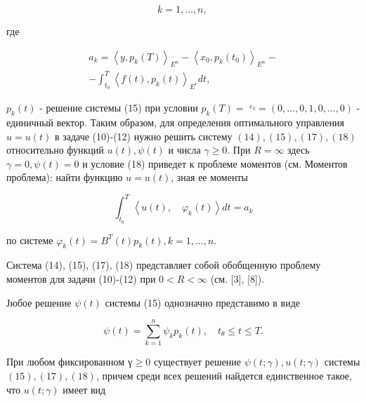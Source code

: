 \documentclass[10pt]{article}
\begin{document}
\[

k=1, \ldots, n \text {, }

\]



где



\[

\begin{gathered}

a_{k}=\left\langle y, p_{k}(T)\right\rangle_{E^{n}}-\left\langle x_{0}, p_{k}\left(t_{0}\right)\right\rangle_{E^{n}}- \\

-\int_{t_{0}}^{T}\left\langle f(t), p_{k}(t)\right\rangle_{E^{r}} d t,

\end{gathered}

\]



$p_{k}(t)$ - решение системы (15) при условии $p_{k}(T)=$ $\stackrel{e_{k}}{ }=(0, \ldots, 0,1,0, \ldots, 0)$ - единичный вектор. Таким образом, для определения оптимального управления $u=u(t)$ в задаче (10)-(12) нужно решить систему $(14),(15),(17),(18)$ относительно функций $u(t), \psi(t)$ и числа $\gamma \geqslant 0$. При $R=\infty$ здесь $\gamma=0, \psi(t)=0$ и условие (18) приведет к проблеме моментов (см. Моментов проблема): найти функцию $u=u(t)$, зная ее моменты



\[

\int_{t_{0}}^{T}\left\langle u(t), \quad \varphi_{k}(t)\right\rangle d t=a_{k}

\]



по системе $\varphi_{k}(t)=B^{T}(t) p_{k}(t), k=1, \ldots, n$.



Система (14), (15), (17), (18) представляет собой обобщенную проблему моментов для задачи (10)-(12) при $0<R<\infty$ (см. [3], [8]).



Јюбое решение $\psi(t)$ системы (15) однозначно представимо в виде



\[

\psi(t)=\sum_{k=1}^{n} \psi_{k} p_{k}(t), \quad t_{\theta} \leqslant t \leqslant T .

\]



При любом фиксированном $ү \geqslant 0$ существует решение $\psi(t ; \gamma), u(t ; \gamma)$ системы $(15),(17),(18)$, причем среди всех решений найдется единственное такое, что $u(t ; \gamma)$ имеет вид
\end{document}
